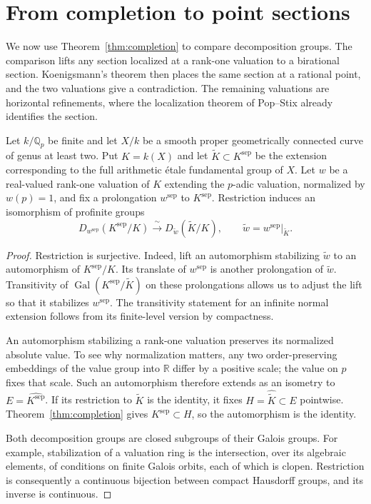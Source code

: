 \section{From completion to point sections}\label{sec:sections}

We now use Theorem~\ref{thm:completion} to compare decomposition groups.
The comparison lifts any section localized at a rank-one valuation to a
birational section.  Koenigsmann's theorem then places the same section at
a rational point, and the two valuations give a contradiction.  The
remaining valuations are horizontal refinements, where the localization
theorem of Pop--Stix already identifies the section.

\begin{corollary}\label{cor:decomposition}
Let $k/\mathbb Q_p$ be finite and let $X/k$ be a smooth proper
geometrically connected curve of genus at least two.  Put $K=k(X)$ and
let $\widetilde K\subset K^{\mathrm{sep}}$ be the extension corresponding
to the full arithmetic \'etale fundamental group of $X$.  Let $w$ be a
real-valued rank-one valuation of $K$ extending the $p$-adic valuation,
normalized by $w(p)=1$, and fix a prolongation $w^{\mathrm{sep}}$ to
$K^{\mathrm{sep}}$.  Restriction induces an isomorphism of profinite
groups
\[
 D_{w^{\mathrm{sep}}}(K^{\mathrm{sep}}/K)
 \xrightarrow{\ \sim\ }
 D_{\widetilde w}(\widetilde K/K),
 \qquad \widetilde w=w^{\mathrm{sep}}|_{\widetilde K}.
\]
\end{corollary}

\begin{proof}
Restriction is surjective.  Indeed, lift an automorphism stabilizing
$\widetilde w$ to an automorphism of $K^{\mathrm{sep}}/K$.  Its translate
of $w^{\mathrm{sep}}$ is another prolongation of $\widetilde w$.
Transitivity of $\operatorname{Gal}(K^{\mathrm{sep}}/\widetilde K)$ on
these prolongations allows us to adjust the lift so that it stabilizes
$w^{\mathrm{sep}}$.  The transitivity statement for an infinite normal
extension follows from its finite-level version by compactness.

An automorphism stabilizing a rank-one valuation preserves its normalized
absolute value.  To see why normalization matters, any two
order-preserving embeddings of the value group into $\mathbb R$ differ
by a positive scale; the value on $p$ fixes that scale.  Such an
automorphism therefore extends as an isometry to
$E=\widehat{K^{\mathrm{sep}}}$.  If its restriction to $\widetilde K$ is
the identity, it fixes $H=\widehat{\widetilde K}\subset E$ pointwise.
Theorem~\ref{thm:completion} gives $K^{\mathrm{sep}}\subset H$, so the
automorphism is the identity.

Both decomposition groups are closed subgroups of their Galois groups.
For example, stabilization of a valuation ring is the intersection,
over its algebraic elements, of conditions on finite Galois orbits, each
of which is clopen.  Restriction is consequently a continuous bijection
between compact Hausdorff groups, and its inverse is continuous.
\end{proof}

